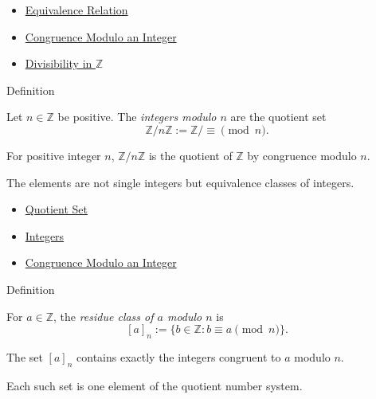 \begin{dependencies}
\begin{itemize}
  \item \hyperref[def:equivalence-relation]{Equivalence Relation}
  \item \hyperref[def:congruence-modulo-integer]{Congruence Modulo an Integer}
  \item \hyperref[def:divisibility-in-z]{Divisibility in \(\mathbb{Z}\)}
\end{itemize}
\end{dependencies}

\begin{definitionbox}{Definition}
\begin{definition}
\label{def:integers-modulo-n}
Let \(n\in\mathbb{Z}\) be positive. The \emph{integers modulo \(n\)} are the
quotient set
\[
\mathbb{Z}/n\mathbb{Z}:=\mathbb{Z}/{\equiv \pmod n}.
\]
\end{definition}

\begin{remark*}
For positive integer \(n\), \(\mathbb{Z}/n\mathbb{Z}\) is the quotient of
\(\mathbb{Z}\) by congruence modulo \(n\).
\end{remark*}

\begin{remark*}[Interpretation]
The elements are not single integers but equivalence classes of integers.
\end{remark*}
\end{definitionbox}

\begin{dependencies}
\begin{itemize}
  \item \hyperref[def:quotient-set]{Quotient Set}
  \item \hyperref[def:integers]{Integers}
  \item \hyperref[def:congruence-modulo-integer]{Congruence Modulo an Integer}
\end{itemize}
\end{dependencies}

\begin{definitionbox}{Definition}
\begin{definition}
\label{def:residue-class-modulo-n}
For \(a\in\mathbb{Z}\), the \emph{residue class of \(a\) modulo \(n\)} is
\[
[a]_n:=\{b\in\mathbb{Z}: b\equiv a\pmod n\}.
\]
\end{definition}

\begin{remark*}
The set \([a]_n\) contains exactly the integers congruent to \(a\) modulo \(n\).
\end{remark*}

\begin{remark*}[Interpretation]
Each such set is one element of the quotient number system.
\end{remark*}
\end{definitionbox}

